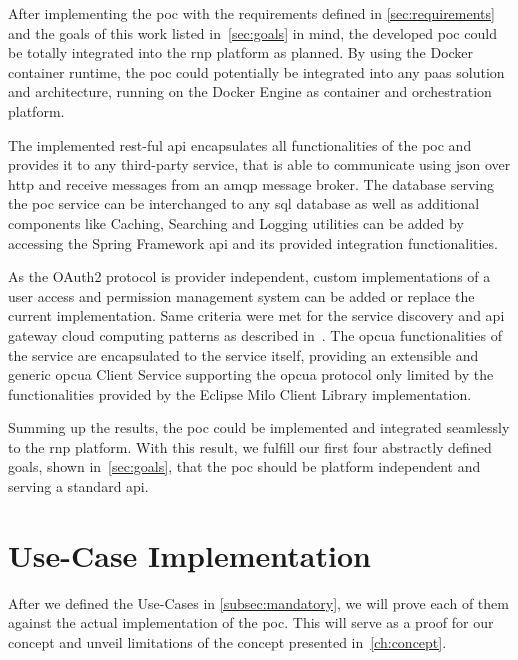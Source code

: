 \documentclass[
a4paper,
twoside,
headsepline,
cleardoublepage=empty,
parskip=half,
draft=false
]{scrbook}
\begin{document}
			After implementing the \gls{poc} with the requirements defined in \cref{sec:requirements} and the goals of this work listed in~\cref{sec:goals} in mind, the developed \gls{poc} could be totally integrated into the \gls{rnp} platform as planned. By using the Docker container runtime, the \gls{poc} could potentially be integrated into any \gls{paas} solution and architecture, running on the Docker Engine as container and orchestration platform.

			The implemented \gls{rest}-ful \gls{api} encapsulates all functionalities of the \gls{poc} and provides it to any third-party service, that is able to communicate using \gls{json} over \gls{http} and receive messages from an \gls{amqp} message broker. The database serving the \gls{poc} service can be interchanged to any \gls{sql} database as well as additional components like Caching, Searching and Logging utilities can be added by accessing the Spring Framework \gls{api} and its provided integration functionalities.

			As the OAuth2 protocol is provider independent, custom implementations of a user access and permission management system can be added or replace the current implementation. Same criteria were met for the service discovery and \gls{api} gateway cloud computing patterns as described in~\cite{leymann2011cloud}.
			The \gls{opcua} functionalities of the service are encapsulated to the service itself, providing an extensible and generic \gls{opcua} Client Service supporting the \gls{opcua} protocol only limited by the functionalities provided by the Eclipse Milo Client Library implementation.

			Summing up the results, the \gls{poc} could be implemented and integrated seamlessly to the \gls{rnp} platform. With this result, we fulfill our first four abstractly defined goals, shown in~\cref{sec:goals}, that the \gls{poc} should be platform independent and serving a standard \gls{api}.

		\section{Use-Case Implementation}\label{sec:use_cases_implementation}

			After we defined the Use-Cases in \cref{subsec:mandatory}, we will prove each of them against the actual implementation of the \gls{poc}. This will serve as a proof for our concept and unveil limitations of the concept presented in~\cref{ch:concept}.
\end{document}

